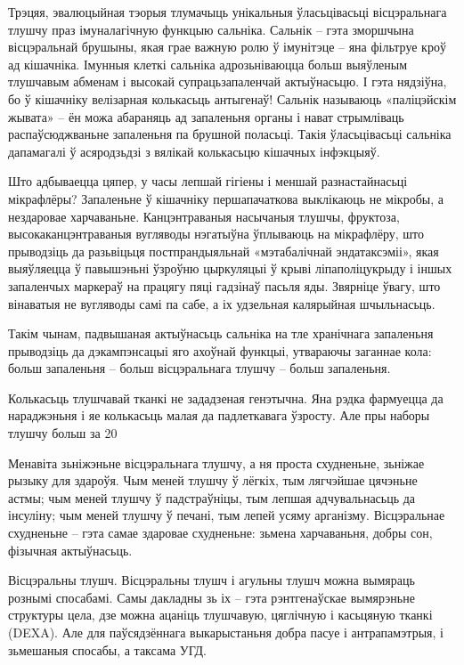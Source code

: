 Трэцяя, эвалюцыйная тэорыя тлумачыць унікальныя ўласьцівасьці вісцэральнага тлушчу праз імуналагічную функцыю сальніка. Сальнік – гэта зморшчына вісцэральнай брушыны, якая грае важную ролю ў імунітэце – яна фільтруе кроў ад кішачніка. Імунныя клеткі сальніка адрозьніваюцца больш выяўленым тлушчавым абменам і высокай супрацьзапаленчай актыўнасьцю. І гэта нядзіўна, бо ў кішачніку велізарная колькасьць антыгенаў! Сальнік называюць «паліцэйскім жывата» – ён можа абараняць ад запаленьня органы і нават стрымліваць распаўсюджваньне запаленьня па брушной поласьці. Такія ўласьцівасьці сальніка дапамагалі ў асяродзьдзі з вялікай колькасьцю кішачных інфэкцыяў.

Што адбываецца цяпер, у часы лепшай гігіены і меншай разнастайнасьці мікрафлёры? Запаленьне ў кішачніку першапачаткова выклікаюць не мікробы, а нездаровае харчаваньне. Канцэнтраваныя насычаныя тлушчы, фруктоза, высокаканцэнтраваныя вугляводы нэгатыўна ўплываюць на мікрафлёру, што прыводзіць да разьвіцьця постпрандыяльнай «мэтабалічнай эндатаксэміі», якая выяўляецца ў павышэньні ўзроўню цыркуляцыі ў крыві ліпаполіцукрыду і іншых запаленчых маркераў на працягу пяці гадзінаў пасьля яды. Звярніце ўвагу, што вінаватыя не вугляводы самі па сабе, а іх удзельная калярыйная шчыльнасьць.

Такім чынам, падвышаная актыўнасьць сальніка на тле хранічнага запаленьня прыводзіць да дэкампэнсацыі яго ахоўнай функцыі, утвараючы заганнае кола: больш запаленьня – больш вісцэральнага тлушчу – больш запаленьня.

Колькасьць тлушчавай тканкі не зададзеная генэтычна. Яна рэдка фармуецца да нараджэньня і яе колькасьць малая да падлеткавага ўзросту. Але пры наборы тлушчу больш за 20%

Менавіта зьніжэньне вісцэральнага тлушчу, а ня проста схудненьне, зьніжае рызыку для здароўя. Чым меней тлушчу ў лёгкіх, тым лягчэйшае цячэньне астмы; чым меней тлушчу ў падстраўніцы, тым лепшая адчувальнасьць да інсуліну; чым меней тлушчу ў печані, тым лепей усяму арганізму. Вісцэральнае схудненьне – гэта самае здаровае схудненьне: зьмена харчаваньня, добры сон, фізычная актыўнасьць.

Вісцэральны тлушч. Вісцэральны тлушч і агульны тлушч можна вымяраць рознымі спосабамі. Самы дакладны зь іх – гэта рэнтгенаўскае вымярэньне структуры цела, дзе можна ацаніць тлушчавую, цяглічную і касьцяную тканкі (DEXA). Але для паўсядзённага выкарыстаньня добра пасуе і антрапамэтрыя, і зьмешаныя спосабы, а таксама УГД.

